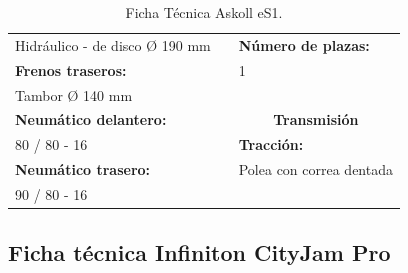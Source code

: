 \begin{table}[H]
\begin{tabular}{lll}
Hidráulico - de disco Ø 190 mm      &  & \textbf{Número de plazas:}                \\
\textbf{Frenos traseros:}           &  & 1                                         \\
Tambor Ø 140 mm                     &  &                                           \\
\textbf{Neumático delantero:}       &  & \multicolumn{1}{c}{\textbf{Transmisión}}  \\ \cline{3-3} 
80 / 80 - 16                        &  & \textbf{Tracción:}                        \\
\textbf{Neumático trasero:}         &  & Polea con correa dentada                  \\
90 / 80 - 16                        &  &                                          
\end{tabular}
\caption{Ficha Técnica Askoll eS1.}
\label{tab: ficha tecnica askoll}
\end{table}


\newpage
\subsection{Ficha técnica Infiniton CityJam Pro}
\label{subanexo: ficha tecnica infinity cityjam}

